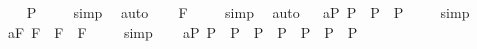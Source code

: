 \begin{isabellebody}
%
\isadelimproof
%
\endisadelimproof
\isanewline
\isanewline
\ \isamarkupfalse%
\ {\isachardoublequoteopen}{\isacharbrackleft}{\isacharparenleft}\isactrlbold {\isasymexists}{\isasymphi}{\isachardot}\ {\isasymphi}\isactrlsup P{\isacharparenright}{\isacharbrackright}\ {\isacharequal}\ {\isasymtop}{\isachardoublequoteclose}%
\isadelimproof
\ %
\endisadelimproof
%
\isatagproof
{}\isamarkupfalse%
\ simp\ \isamarkupfalse%
\ auto%
\endisatagproof
{\isafoldproof}%
%
\isadelimproof
%
\endisadelimproof
\isanewline
\ \isamarkupfalse%
\ {\isachardoublequoteopen}{\isacharbrackleft}{\isacharparenleft}\isactrlbold {\isasymexists}{\isasymphi}{\isachardot}\ {\isasymphi}\isactrlsup F{\isacharparenright}{\isacharbrackright}\ {\isacharequal}\ {\isasymtop}{\isachardoublequoteclose}%
\isadelimproof
\ %
\endisadelimproof
%
\isatagproof
{}\isamarkupfalse%
\ simp\ \isamarkupfalse%
\ auto%
\endisatagproof
{\isafoldproof}%
%
\isadelimproof
%
\endisadelimproof
%
\isamarkuptrue%
%
\isamarkuptrue%
\ \isamarkupfalse%
\ a{}{}{\isacharunderscore}{}{\isacharunderscore}P{\isacharcolon}\ {\isachardoublequoteopen}{\isacharbrackleft}{\isasymphi}\isactrlsup P\ \isactrlbold {\isasymrightarrow}\ {\isacharparenleft}{\isasymphi}\isactrlsup P\ \isactrlbold {\isasymrightarrow}\ {\isasymphi}\isactrlsup P{\isacharparenright}{\isacharbrackright}\ {\isacharequal}\ {\isasymtop}{\isachardoublequoteclose}%
\isadelimproof
\ %
\endisadelimproof
%
\isatagproof
{}\isamarkupfalse%
\ simp\ \isamarkupfalse%
%
\endisatagproof
{\isafoldproof}%
%
\isadelimproof
%
\endisadelimproof
\isanewline
\ \isamarkupfalse%
\ a{}{}{\isacharunderscore}{}{\isacharunderscore}F{\isacharcolon}\ {\isachardoublequoteopen}{\isacharbrackleft}{\isasymphi}\isactrlsup F\ \isactrlbold {\isasymrightarrow}\ {\isacharparenleft}{\isasymphi}\isactrlsup F\ \isactrlbold {\isasymrightarrow}\ {\isasymphi}\isactrlsup F{\isacharparenright}{\isacharbrackright}\ {\isacharequal}\ {\isasymtop}{\isachardoublequoteclose}%
\isadelimproof
\ %
\endisadelimproof
%
\isatagproof
{}\isamarkupfalse%
\ simp\ \isamarkupfalse%
%
\endisatagproof
{\isafoldproof}%
%
\isadelimproof
%
\endisadelimproof
\isanewline
\ \isamarkupfalse%
\ a{}{}{\isacharunderscore}{}{\isacharunderscore}P{\isacharcolon}\ {\isachardoublequoteopen}{\isacharbrackleft}{\isacharparenleft}{\isasymphi}\isactrlsup P\ \isactrlbold {\isasymrightarrow}\ {\isacharparenleft}{\isasympsi}\isactrlsup P\ \isactrlbold {\isasymrightarrow}\ {\isasymchi}\isactrlsup P{\isacharparenright}{\isacharparenright}\ \isactrlbold {\isasymrightarrow}\ {\isacharparenleft}{\isacharparenleft}{\isasymphi}\isactrlsup P\ \isactrlbold {\isasymrightarrow}\ {\isasympsi}\isactrlsup P{\isacharparenright}\ \isactrlbold {\isasymrightarrow}\ {\isacharparenleft}{\isasymphi}\isactrlsup P\ \isactrlbold {\isasymrightarrow}\ {\isasymchi}\isactrlsup P{\isacharparenright}{\isacharparenright}{\isacharbrackright}\ {\isacharequal}\ {\isasymtop}{\isachardoublequoteclose}%

\end{isabellebody}
